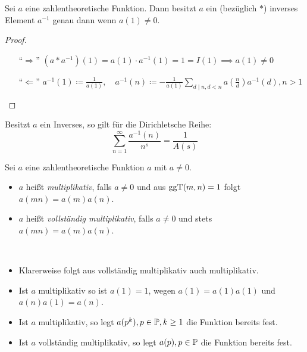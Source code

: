 \begin{lemma}    
    Sei $a$ eine zahlentheoretische Funktion. Dann besitzt $a$ ein (bezüglich $\ast$) inverses Element $a^{-1}$ genau dann wenn $a(1) \neq 0$.
\end{lemma}

\begin{proof}{\ }
    \begin{itemize}
        \item[``$\Rightarrow$''] $ (a \ast a^{-1})(1) = a(1) \cdot a^{-1}(1) = 1 = I(1) \implies a(1) \neq 0 $
        \item[``$\Leftarrow$''] $ a^{-1}(1) \coloneqq \frac{1}{a(1)}, \quad a^{-1}(n) \coloneqq -\frac{1}{a(1)} \sum_{d \mid n, d < n} a(\frac{n}{d}) a^{-1}(d), n > 1 $
    \end{itemize}
\end{proof}

\begin{remark}
    Besitzt $a$ ein Inverses, so gilt für die Dirichletsche Reihe:
    $$ \sum_{n=1}^\infty \frac{a^{-1}(n)}{n^s} = \frac{1}{A(s)} $$
\end{remark}

\begin{definition}
    Sei $a$ eine zahlentheoretische Funktion $a$ mit $a \neq 0$.
    \begin{itemize}
        \item $a$ heißt \emph{multiplikativ}, falls $a \neq 0$ und aus $\ggT(m, n) = 1$ folgt $a(mn) = a(m) a(n)$.
        \item $a$ heißt \emph{vollständig multiplikativ}, falls $a \neq 0$ und stets $a(mn) = a(m) a(n)$.
    \end{itemize}
\end{definition}

\begin{remark}{\ }
    \begin{itemize}
        \item Klarerweise folgt aus vollständig multiplikativ auch multiplikativ.
        \item Ist $a$ multiplikativ so ist $a(1) = 1$, wegen $a(1) = a(1) a(1)$ und $a(n) a(1) = a(n)$.
        \item Ist $a$ multiplikativ, so legt $a(p^k), p \in \P, k \geq 1$ die Funktion bereits fest.
        \item Ist $a$ vollständig multiplikativ, so legt $a(p), p \in \P$ die Funktion bereits fest.
    \end{itemize}
\end{remark}

